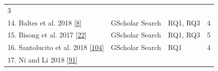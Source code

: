 \documentclass[]{book}
\begin{document}
\begin{longtable}[]{@{}llll@{}}
\begin{minipage}[t]{0.06\columnwidth}
3\strut
\end{minipage}\tabularnewline
\begin{minipage}[t]{0.48\columnwidth}\raggedright\strut
14. Baltes et al. 2018
{[}\protect\hyperlink{ref-baltes2018no}{8}{]}\strut
\end{minipage} & \begin{minipage}[t]{0.20\columnwidth}\raggedright\strut
GScholar Search\strut
\end{minipage} & \begin{minipage}[t]{0.14\columnwidth}\raggedright\strut
RQ1, RQ3\strut
\end{minipage} & \begin{minipage}[t]{0.06\columnwidth}\raggedright\strut
4\strut
\end{minipage}\tabularnewline
\begin{minipage}[t]{0.48\columnwidth}\raggedright\strut
15. Bisong et al. 2017
{[}\protect\hyperlink{ref-bisong2017built}{22}{]}\strut
\end{minipage} & \begin{minipage}[t]{0.20\columnwidth}\raggedright\strut
GScholar Search\strut
\end{minipage} & \begin{minipage}[t]{0.14\columnwidth}\raggedright\strut
RQ1, RQ3\strut
\end{minipage} & \begin{minipage}[t]{0.06\columnwidth}\raggedright\strut
5\strut
\end{minipage}\tabularnewline
\begin{minipage}[t]{0.48\columnwidth}\raggedright\strut
16. Santolucito et al. 2018
{[}\protect\hyperlink{ref-santolucito2018statically}{104}{]}\strut
\end{minipage} & \begin{minipage}[t]{0.20\columnwidth}\raggedright\strut
GScholar Search\strut
\end{minipage} & \begin{minipage}[t]{0.14\columnwidth}\raggedright\strut
RQ1\strut
\end{minipage} & \begin{minipage}[t]{0.06\columnwidth}\raggedright\strut
4\strut
\end{minipage}\tabularnewline
\begin{minipage}[t]{0.48\columnwidth}\raggedright\strut
17. Ni and Li 2018 {[}\protect\hyperlink{ref-ni2018acona}{91}{]}\strut
\end{minipage} & \begin{minipage}[t]{0.20\columnwidth}\raggedright\strut

\end{minipage}
\end{longtable}
\end{document}
